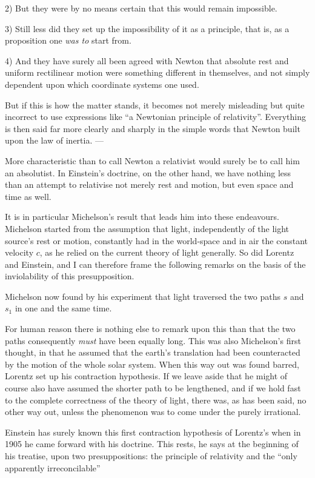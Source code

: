 \documentclass[12pt,a4paper]{article}
\begin{document}
2) But they were by no means certain that this would remain impossible.

3) Still less did they set up the impossibility of it as a principle, that is,
as a proposition one \emph{was to} start from.

4) And they have surely all been agreed with Newton that absolute rest and
uniform rectilinear motion were something different in themselves, and not
simply dependent upon which coordinate systems one used.

But if this is how the matter stands, it becomes not merely misleading but
quite incorrect to use expressions like ``a Newtonian principle of
relativity''. Everything is then said far more clearly and sharply in the
simple words that Newton built upon the law of inertia. ---

More characteristic than to call Newton a relativist would surely be to call
him an absolutist. In Einstein's doctrine, on the other hand, we have nothing
less than an attempt to relativise not merely rest and motion, but even space
and time as well.

It is in particular Michelson's result that leads him into these endeavours.
Michelson started from the assumption that light, independently of the light
source's rest or motion, constantly had in the world-space and in air the
constant velocity $c$, as he relied on the current theory of light generally.
So did Lorentz and Einstein, and I can therefore frame the following remarks
on the basis of the inviolability of this presupposition.

Michelson now found by his experiment that light traversed the two paths $s$
and $s_{1}$ in one and the same time.

For human reason there is nothing else to remark upon this than that the two
paths consequently \emph{must} have been equally long. This was also
Michelson's first thought, in that he assumed that the earth's translation had
been counteracted by the motion of the whole solar system. When this way out
was found barred, Lorentz set up his contraction hypothesis. If we leave aside
that he might of course also have assumed the shorter path to be lengthened,
and if we hold fast to the complete correctness of the theory of light, there
was, as has been said, no other way out, unless the phenomenon was to come
under the purely irrational.

Einstein has surely known this first contraction hypothesis of Lorentz's when
in 1905 he came forward with his doctrine. This rests, he says at the
beginning of his treatise, upon two presuppositions: the principle of
relativity and the ``only apparently irreconcilable''
\end{document}
